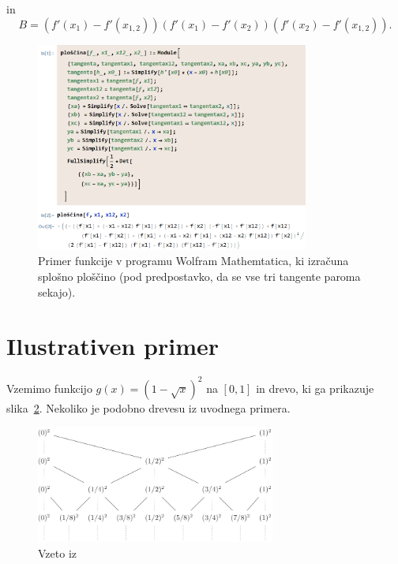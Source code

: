\documentclass[a4paper, 12pt, titlepage]{article}
\begin{document}
in
$$
B = (f'(x_1) - f'(x_{1,2}))(f'(x_1) - f'(x_2))(f'(x_2) - f'(x_{1,2}))\text{.}
$$

\begin{figure}[h!]
    \centering
    \includegraphics[width=0.8\textwidth]{slike/splosna_ploscina.png}
    \caption{Primer funkcije v programu Wolfram Mathemtatica, ki izračuna splošno ploščino (pod predpostavko, da se vse tri tangente paroma sekajo).}
    \label{splosna_ploscina}
\end{figure}


\section{Ilustrativen primer} \label{ilustrativen_primer}

Vzemimo funkcijo $ g(x) = (1 - \sqrt{x})^2 $ na $ [0, 1] $ in drevo, ki ga prikazuje slika~\ref{ilustrativen_primer_drevo}. Nekoliko je podobno drevesu iz uvodnega primera.

\begin{figure}[h]
    \centering
    \includegraphics[width=0.7\textwidth]{slike/ilustrativen_primer_drevo.png}
    \caption{Vzeto iz~\cite{osnovni_clanek}}
    \label{ilustrativen_primer_drevo}
\end{figure}
\end{document}
